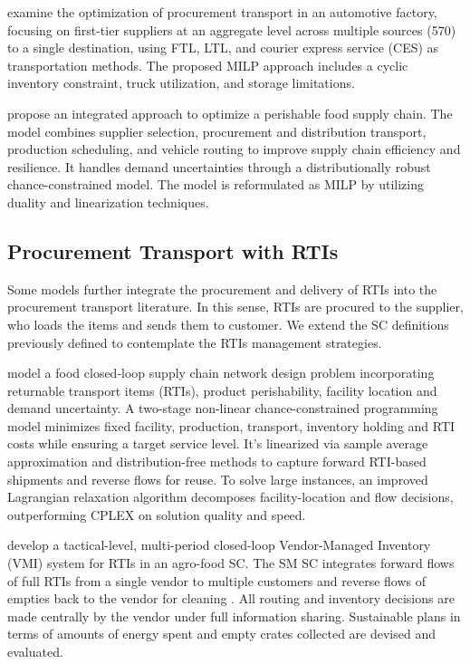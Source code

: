 \autocite{Baller2022OptimizingApproach} examine the optimization of procurement transport in an automotive factory, focusing on first-tier suppliers at an aggregate level across multiple sources (570) to a single destination, using FTL, LTL, and courier express service (CES) as transportation methods. The proposed MILP approach includes a cyclic inventory constraint, truck utilization, and storage limitations.

\autocite{Hashemi-Amiri2023IntegratedApproach} propose an integrated approach to optimize a perishable food supply chain. The model combines supplier selection, procurement and distribution transport, production scheduling, and vehicle routing to improve supply chain efficiency and resilience. It handles demand uncertainties through a distributionally robust chance-constrained model. The model is reformulated as MILP by utilizing duality and linearization techniques.


\subsection{Procurement Transport with RTIs}
Some models further integrate the procurement and delivery of RTIs into the procurement transport literature. In this sense, RTIs are procured to the supplier, who loads the items and sends them to customer. We extend the SC definitions previously defined to contemplate the RTIs management strategies.

model a food closed-loop supply chain network design problem incorporating returnable transport items (RTIs), product perishability, facility location and demand uncertainty. A two-stage non-linear chance-constrained programming model minimizes fixed facility, production, transport, inventory holding and RTI costs while ensuring a target service level. It’s linearized via sample average approximation and distribution-free methods to capture forward RTI-based shipments and reverse flows for reuse. To solve large instances, an improved Lagrangian relaxation algorithm decomposes facility-location and flow decisions, outperforming CPLEX on solution quality and speed.


\autocite{SOYSAL2023101504} develop a tactical-level, multi-period closed-loop Vendor-Managed Inventory (VMI) system for RTIs in an agro-food SC. The SM SC integrates forward flows of full RTIs from a single vendor to multiple customers and reverse flows of empties back to the vendor for cleaning . All routing and inventory decisions are made centrally by the vendor under full information sharing. Sustainable plans in terms of amounts of energy spent and empty crates collected are devised and evaluated.


